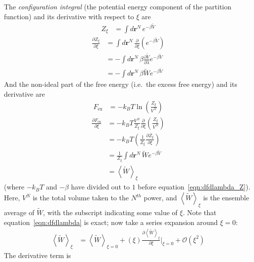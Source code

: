 \documentclass[letterpaper,twocolumn,amsmath,amssymb,prb]{revtex4-1}
\newcommand{\kT}{\ensuremath{k_BT}}
\newcommand{\rr}{\ensuremath{\mathbf{r}}}
\newcommand{\Fex}{\ensuremath{F_\text{ex}}}
\newcommand{\Vtilde}{\ensuremath{\widetilde{V}}}
\newcommand{\Wtilde}{\ensuremath{\widetilde{W}}}
\begin{document}
The \emph{configuration integral} (the potential energy component of
the partition function) and its derivative with respect to $\xi$
are
\begin{align}
  Z_\xi &= \int d\rr^N\, e^{-\beta \Vtilde}
\end{align}
\begin{align}
  \frac{\partial Z_\xi}{\partial\xi} &=  \int d\rr^N\, \frac{\partial}{\partial\xi}\left( e^{-\beta \Vtilde} \right) \nonumber \\
  &= -\int d\rr^N\, \beta\frac{\partial \Vtilde}{\partial\lambda}e^{-\beta \Vtilde} \nonumber \\
  &= -\int d\rr^N\, \beta \Wtilde e^{-\beta \Vtilde}
\end{align}
And the non-ideal part of the free energy (i.e.~the excess free
energy) and its derivative are
\begin{align}
  \Fex &= -\kT\ln\left( \frac{Z_\xi}{V^N} \right)
\end{align}
\begin{align}
  \frac{\partial \Fex}{\partial\xi} &= -\kT\frac{V^N}{Z_\xi}\frac{\partial}{\partial\xi}\left( \frac{Z_\xi}{V^N} \right) \nonumber \\
  &= -\kT\left( \frac{1}{Z_\xi}\frac{\partial Z_\xi}{\partial\xi} \right) \nonumber \\
  &= \frac{1}{Z_\xi} \int d\rr^N\, \Wtilde e^{-\beta \Vtilde} \label{eqn:dfdlambda_Z}\\
  &= \left\langle \Wtilde \right\rangle_{\xi} \label{eqn:dfdlambda}
\end{align}
(where $-\kT$ and $-\beta$ have divided out to $1$ before equation~\ref{eqn:dfdlambda_Z}). Here, $V^N$ is
the total volume taken to the $N^{th}$ power, and $\left\langle \Wtilde
\right\rangle_{\xi}$ is the ensemble average of $\Wtilde$, with the
subscript indicating some value of $\xi$.
Note that equation~\ref{eqn:dfdlambda} is exact; now take a series expansion around $\xi=0$:
\begin{align}
  \left\langle \Wtilde \right\rangle_{\xi} &= \left\langle \Wtilde\right\rangle_{\xi = 0} + (\xi)\frac{\partial\left\langle \Wtilde \right\rangle_{\xi}}{\partial\xi}\bigg|_{\xi = 0} + \mathcal{O}(\xi^2) \label{eqn:Wn-expansion}
\end{align}
The derivative term is
\end{document}
